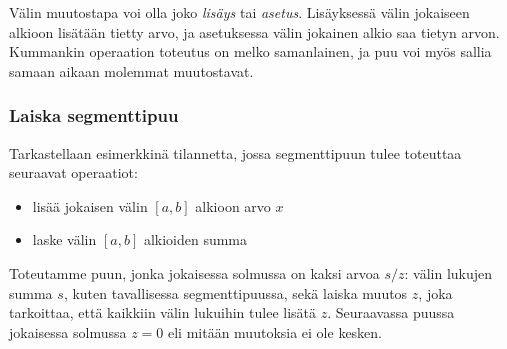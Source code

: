 Välin muutostapa voi olla joko
\textit{lisäys} tai \textit{asetus}.
Lisäyksessä välin jokaiseen alkioon lisätään
tietty arvo, ja asetuksessa välin
jokainen alkio saa tietyn arvon.
Kummankin operaation toteutus on melko samanlainen,
ja puu voi myös sallia samaan aikaan
molemmat muutostavat.

\subsubsection{Laiska segmenttipuu}

Tarkastellaan esimerkkinä tilannetta,
jossa segmenttipuun
tulee toteuttaa seuraavat operaatiot:
\begin{itemize}
\item lisää jokaisen välin $[a,b]$ alkioon arvo $x$
\item laske välin $[a,b]$ alkioiden summa
\end{itemize}
Toteutamme puun, jonka jokaisessa
solmussa on kaksi arvoa $s/z$:
välin lukujen summa $s$,
kuten tavallisessa segmenttipuussa, sekä
laiska muutos $z$,
joka tarkoittaa,
että kaikkiin välin lukuihin tulee lisätä $z$.
Seuraavassa puussa jokaisessa solmussa $z=0$
eli mitään muutoksia ei ole kesken.
